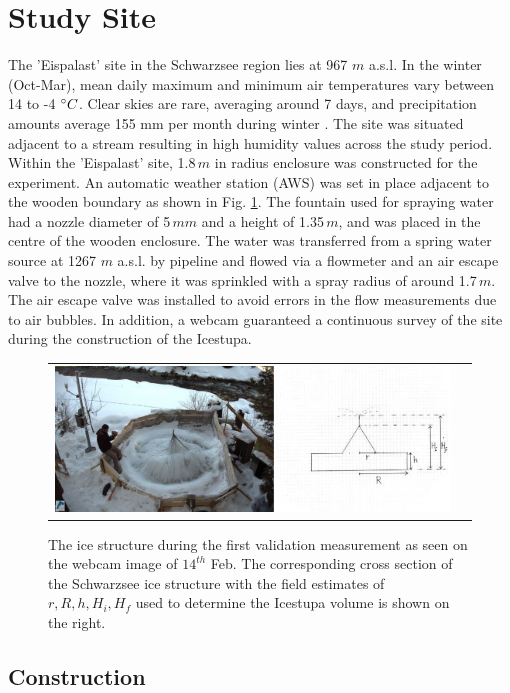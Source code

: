 \documentclass[utf8]{frontiersSCNS} %
\begin{document}
\section{Study Site}
The 'Eispalast' site in the Schwarzsee region lies at 967 $m$ a.s.l. In the winter (Oct-Mar), mean daily maximum and
minimum air temperatures vary between 14 to -4 $\degree C$. Clear skies are rare, averaging around 7 days, and
precipitation amounts average 155 mm per month during winter \citep{eispalast}. The site was situated adjacent to a
stream resulting in high humidity values across the study period. Within the 'Eispalast' site, 1.8\,$m$ in radius
enclosure was constructed for the experiment. An automatic weather station (AWS) was set in place adjacent to the
wooden boundary as shown in Fig. \ref{fig:site}. The fountain used for spraying water had a nozzle diameter of 5\,$mm$
and a height of 1.35\,$m$, and was placed in the centre of the wooden enclosure. The water was transferred from a
spring water source at 1267 $m$ a.s.l. by pipeline and flowed via a flowmeter and an air escape valve to the nozzle,
where it was sprinkled with a spray radius of around 1.7\,$m$. The air escape valve was installed to avoid errors in
the flow measurements due to air bubbles. In addition, a webcam guaranteed a continuous survey of the site during the
construction of the Icestupa. 

\begin{figure}[htb] \centering \begin{tabular}{@{}cc@{}} \includegraphics[width=15cm]{./Figures/Figure_2.jpg} &
\end{tabular} \caption{The ice structure during the first validation measurement as seen on the webcam image of
  $14^{th}$ Feb. The corresponding cross section of the Schwarzsee ice structure with the field estimates of $r, R, h,
H_i, H_f$ used to determine the Icestupa volume is shown on the right.} \label{fig:site} \end{figure}

\subsection{Construction}
\end{document}
